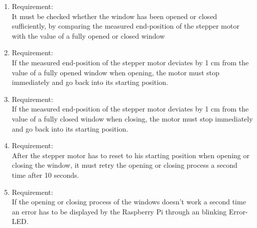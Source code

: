 \begin{enumerate}[label*=\arabic*.]
  	\begin{enumerate}[label*=\arabic*.]
			\item \label{req.4.1}  Requirement:  \\
            It must be checked whether the window has been opened or closed sufficiently, by comparing the measured end-position of the stepper motor with the value of a fully opened or closed window\\  
			\item \label{req.4.2}  Requirement:  \\
            If the measured end-position of the stepper motor deviates by 1 cm from the value of a fully opened window when opening, the motor must stop immediately and go back into its starting position.\\   
			\item \label{req.4.3}  Requirement:  \\
			If the measured end-position of the stepper motor deviates by 1 cm from the value of a fully closed window when closing, the motor must stop immediately and go back into its starting position.\\  
			\item \label{req.4.4}  Requirement:  \\
		      After the stepper motor has to reset to his starting position when opening or closing the window, it must retry the opening or closing process a second time after 10 seconds.\\  
			\item \label{req.4.5}  Requirement:  \\
			If the opening or closing process of the windows doesn't work a second time an error has to be displayed by the Raspberry Pi through an blinking Error-LED.\\  
	  \end{enumerate}         
	\end{enumerate}


 

